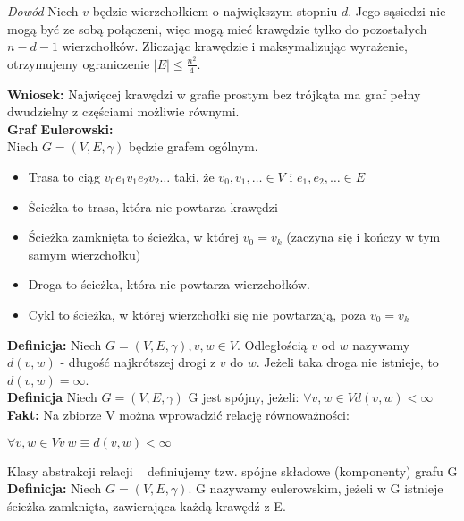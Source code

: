 \documentclass{article}
\begin{document}
\vspace{0.5em}
\textit{Dowód} Niech $v$ będzie wierzchołkiem o największym stopniu $d$. Jego sąsiedzi nie mogą być ze sobą połączeni, więc mogą mieć krawędzie tylko do pozostałych $n-d-1$ wierzchołków. Zliczając krawędzie i maksymalizując wyrażenie, otrzymujemy ograniczenie $|E| \leq \frac{n^2}{4}$. 

\textbf{Wniosek:} Najwięcej krawędzi w grafie prostym bez trójkąta ma graf pełny dwudzielny z częściami możliwie równymi. \\
\newpage
\textbf{Graf Eulerowski:} \\
Niech $G = (V, E, \gamma)$ będzie grafem ogólnym.
\begin{itemize}
    \item Trasa to ciąg $v_{0} e_{1} v_{1} e_{2} v_{2} \dots$ taki, że $v_{0}, v_{1}, \dots \in V$ i $e_{1}, e_{2}, \dots \in E$
    \item Ścieżka to trasa, która nie powtarza krawędzi
    \item Ścieżka zamknięta to ścieżka, w której $v_{0} = v_{k}$ (zaczyna się i kończy w tym samym wierzchołku)
    \item Droga to ścieżka, która nie powtarza wierzchołków.
    \item Cykl to ścieżka, w której wierzchołki się nie powtarzają, poza $v_{0} = v_{k}$
\end{itemize}
\textbf{Definicja:} Niech $G = (V, E, \gamma), v,w \in V$. Odległością $v$ od $w$ nazywamy $d(v,w)$ - długość najkrótszej drogi z $v$ do $w$. 
Jeżeli taka droga nie istnieje, to $d(v, w) = \infty$. \\
\textbf{Definicja} Niech $G = (V, E, \gamma)$ G jest spójny, jeżeli: $\forall v, w \in V d(v, w) < \infty$ \\
\textbf{Fakt: } Na zbiorze V można wprowadzić relację równoważności: \\
\begin{center}
    $\forall v, w \in V v~w \equiv d(v, w) < \infty$
\end{center}
Klasy abstrakcji relacji ~ definiujemy tzw. spójne składowe (komponenty) grafu G \\
\textbf{Definicja: } Niech $G = (V, E, \gamma)$. G nazywamy eulerowskim, jeżeli w G istnieje ścieżka zamknięta, zawierająca każdą krawędź z E.
\end{document}
